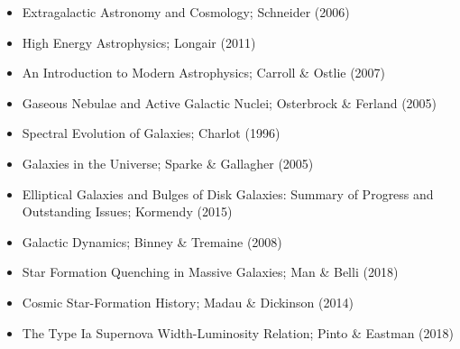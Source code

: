 \documentclass[a4paper,10pt]{article}
\begin{document}
\begin{itemize}
    \item Extragalactic Astronomy and Cosmology; Schneider (2006)
    \item High Energy Astrophysics; Longair (2011)
    \item An Introduction to Modern Astrophysics; Carroll \& Ostlie (2007)
    \item Gaseous Nebulae and Active Galactic Nuclei; Osterbrock \& Ferland (2005)
    \item Spectral Evolution of Galaxies; Charlot (1996)
    \item Galaxies in the Universe; Sparke \& Gallagher (2005)
    \item Elliptical Galaxies and Bulges of Disk Galaxies: Summary of Progress and Outstanding Issues; Kormendy (2015)
    \item Galactic Dynamics; Binney \& Tremaine (2008)
    \item Star Formation Quenching in Massive Galaxies; Man \& Belli (2018)
    \item Cosmic Star-Formation History; Madau \& Dickinson (2014)
    \item The Type Ia Supernova Width-Luminosity Relation; Pinto \& Eastman (2018)
\end{itemize}
\end{document}

